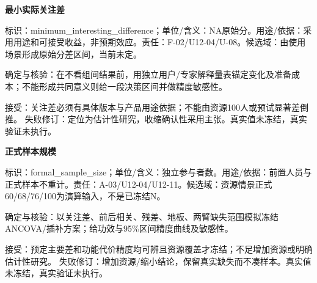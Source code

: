 \documentclass[11pt,a4paper]{article}
\newcommand{\reviewsubsection}[1]{\par\Needspace{4\baselineskip}\begin{center}{\titlelatin\titlecjk\bfseries\fontsize{12}{18}\selectfont #1}\end{center}}
\begin{document}
\begin{minipage}{\linewidth}
\reviewsubsection{8.17 最小实际关注差}
标识：minimum\_\allowbreak{}interesting\_\allowbreak{}difference；单位/\allowbreak{}含义：NA原始分。用途/\allowbreak{}依据：采用用途和可接受收益，非预期效应。责任：F-\allowbreak{}02/\allowbreak{}U12-\allowbreak{}04/\allowbreak{}U-\allowbreak{}08。候选域：由使用场景形成原始分差区间，当前未定。

确定与核验：在不看组间结果前，用独立用户/\allowbreak{}专家解释量表锚定变化及准备成本；不能形成共同意义则给一段决策区间并做精度敏感性。

接受：关注差必须有具体版本与产品用途依据；不能由资源100人或预试显著差倒推。 失败修订：定位为估计性研究，收缩确认性采用主张。真实值未冻结，真实验证未执行。
\end{minipage}\par

\begin{minipage}{\linewidth}
\reviewsubsection{8.18 正式样本规模}
标识：formal\_\allowbreak{}sample\_\allowbreak{}size；单位/\allowbreak{}含义：独立参与者数。用途/\allowbreak{}依据：前置人员与正式样本不重计。责任：A-\allowbreak{}03/\allowbreak{}U12-\allowbreak{}04/\allowbreak{}U12-\allowbreak{}11。候选域：资源情景正式60/\allowbreak{}68/\allowbreak{}76/\allowbreak{}100为演算输入，不是已冻结N。

确定与核验：以关注差、前后相关、残差、地板、两臂缺失范围模拟冻结ANCOVA/\allowbreak{}插补方案；给功效与95\%区间精度曲线及敏感性。

接受：预定主要差和功能代价精度均可辨且资源覆盖才冻结；不足增加资源或明确估计性研究。 失败修订：增加资源/\allowbreak{}缩小结论，保留真实缺失而不凑样本。真实值未冻结，真实验证未执行。
\end{minipage}\par
\end{document}

